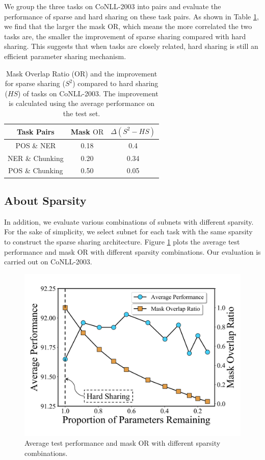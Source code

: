 \documentclass[letterpaper]{article} %
\begin{document}
We group the three tasks on CoNLL-2003 into pairs and evaluate the performance of sparse and hard sharing on these task pairs. As shown in Table \ref{tb:task_or}, we find that the larger the mask OR, which means the more correlated the two tasks are, the smaller the improvement of sparse sharing compared with hard sharing. This suggests that when tasks are closely related, hard sharing is still an efficient parameter sharing mechanism.

\begin{table}[!htbp]
\centering
\begin{tabular}{ccc}
\toprule
Task Pairs & Mask $\mathrm{OR}$ & $\Delta(S^2-HS)$ \\ \midrule
POS \& NER & 0.18 & 0.4 \\
NER \& Chunking & 0.20 & 0.34 \\
POS \& Chunking & 0.50 & 0.05 \\ \bottomrule
\end{tabular}
\caption{Mask Overlap Ratio ($\mathrm{OR}$) and the improvement for sparse sharing ($S^2$) compared to hard sharing ($HS$) of tasks on CoNLL-2003. The improvement is calculated using the average performance on the test set.}
\label{tb:task_or}
\end{table}

\subsection{About Sparsity}
In addition, we evaluate various combinations of subnets with different sparsity. For the sake of simplicity, we select subnet for each task with the same sparsity to construct the sparse sharing architecture. Figure \ref{fig:avg_or} plots the average test performance and mask OR with different sparsity combinations. Our evaluation is carried out on CoNLL-2003.

\begin{figure}[!htbp]
    \centering
    \includegraphics[width=.9\columnwidth]{3353_sparsity.png}
    \caption{Average test performance and mask OR with different sparsity combinations.}
    \label{fig:avg_or}
\end{figure}
\end{document}

